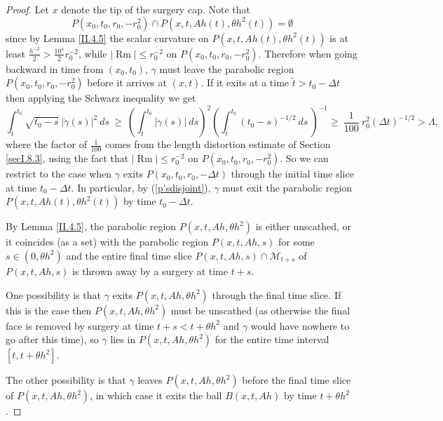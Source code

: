 \documentclass[12pt]{amsart}
\newcommand{\De}{\Delta}
\newcommand{\La}{\Lambda}
\newcommand{\M}{{\mathcal M}}
\newcommand{\Rm}{\operatorname{Rm}}
\renewcommand{\th}{\theta}
\newcommand{\ga}{\gamma}
\numberwithin{equation}{section}
\theoremstyle{plain}
\theoremstyle{definition}
\theoremstyle{remark}
\begin{document}
\begin{proof}
Let $x$ denote the tip of the surgery cap.
Note that 
\begin{equation}
\label{p'sdisjoint}
P(x_0,t_0,r_0,-r_0^2)\cap P(x,t,Ah(t),\th h^2(t))=\emptyset
\end{equation}
since by Lemma \ref{II.4.5} the scalar curvature on 
$P(x,t,Ah(t),\th h^2(t))$ is at least  
$\frac{h^{-2}}{2}>\frac{10^4}{2}r_0^{-2}$, while $|\Rm|\leq r_0^{-2}$
on $P(x_0,t_0,r_0,-r_0^2)$.  Therefore when going backward in time
from $(x_0,t_0)$, $\ga$ must leave the parabolic region
$P(x_0,t_0,r_0,-r_0^2)$
before it arrives at $(x,t)$.
If it exits at a time $\tilde t > t_0-\De t$ then 
applying the Schwarz inequality we get
\begin{equation}
\int_{\tilde{t}}^{t_0} \sqrt{t_0 - s} \: 
|\dot{\gamma}(s)|^2 \: ds \: \ge \:
\left( \int_{\tilde{t}}^{t_0} 
|\dot{\gamma}(s)| \: ds \right)^2 
\left( \int_{\tilde{t}}^{t_0} (t_0 - s)^{-1/2}
\: ds \:\right)^{-1} 
\ge \: \frac{1}{100} \: r_0^2 (\Delta t)^{-1/2}>\La,
\end{equation}
where the factor of $\frac{1}{100}$ comes from 
the length distortion estimate
of Section \ref{secI.8.3},
using the fact that $|\Rm| \le r_0^{-2}$ on $P(x_0, t_0, r_0, -r_0^2)$.
So we can restrict to the case when $\ga$ exits
$P(x_0,t_0,r_0,-\De t)$ through the
initial time slice  at time $t_0-\De t$. In particular,
by (\ref{p'sdisjoint}),
$\gamma$ must exit the parabolic region $P(x,t,Ah(t),\th h^2(t))$
by time $t_0-\De t$.

By Lemma \ref{II.4.5}, the parabolic region $P(x,t,Ah,\theta h^2)$ is 
either unscathed, or it coincides (as a set) with the parabolic
region $P(x,t,Ah,s)$ for some $s\in (0,\th h^2)$ and the entire 
final time slice $P(x,t,Ah,s)\cap \M_{t+s}$
of $P(x,t,Ah,s)$ is thrown away by a surgery 
at time $t+s$. 

One possibility is that  $\gamma$ exits $P(x,t,Ah,\theta h^2)$ 
through the final time slice. If this is the case then $P(x,t,Ah,\theta h^2)$ 
must be unscathed (as otherwise the final face is removed by surgery at 
time $t+s < t+\theta h^2$ and $\gamma$ would have nowhere to go after this time), so
$\gamma$ lies in $P(x,t,Ah,\theta h^2)$ for the entire time interval
$[t, t+\theta h^2]$.

The other possibility is that $\ga$ leaves $P(x,t,Ah,\theta h^2)$ before the
final time slice of $P(x,t,Ah, \theta h^2)$, in which case it exits
the ball $B(x,t,Ah)$ by time $t + \theta h^2$.


\end{proof}
\end{document}
